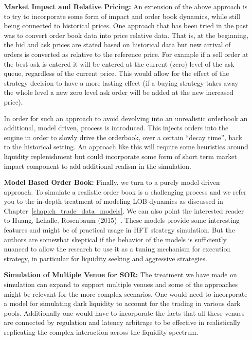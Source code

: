 \noindent\textbf{Market Impact and Relative Pricing:} An extension of the above approach is to try to incorporate some form of impact and order book dynamics, while still being connected to historical prices. One approach that has been tried in the past was to convert order book data into price relative data. That is, at the beginning, the bid and ask prices are stated based on historical data but new arrival of orders is converted as relative to the reference price. For example if a sell order at the best ask is entered it will be entered at the current (zero) level of the ask queue, regardless of the current price. This would allow for the effect of the strategy decision to have a more lasting effect (if a buying strategy takes away the whole level a new zero level ask order will be added at the new increased price). 


In order for such an approach to avoid devolving into an unrealistic orderbook an additional, model driven, process is introduced. This injects orders into the engine in order to slowly drive the orderbook, over a certain ``decay time'', back to the historical setting. An approach like this will require some heuristics around liquidity replenishment but could incorporate some form of short term market impact component to add additional realism in the simulation. \twomedskip


\noindent\textbf{Model Based Order Book:} Finally, we turn to a purely model driven approach. To simulate a realistic order book is a challenging process and we refer you to the in-depth treatment of modeling LOB dynamics as discussed in Chapter~\ref{chap:ch_trade_data_models}. We can also point the interested reader to Huang, Lehalle, Rosenbaum (2015)~\cite{hlehros}. These models provide some interesting features and might be of practical usage in HFT strategy simulation. But the authors are somewhat skeptical if the behavior of the models is sufficiently nuanced to allow the research to use it as a tuning mechanism for execution strategy, in particular for liquidity seeking and aggressive strategies.
\twomedskip


\noindent\textbf{Simulation of Multiple Venue for SOR:} The treatment we have made on simulation can expand to support multiple venues and some of the approaches might be relevant for the more complex scenarios. One would need to incorporate a model for simulating dark liquidity to account for the trading in various dark pools. Additionally one would have to incorporate the facts that all these venues are connected by regulation and latency arbitrage to be effective in realistically replicating the complex interaction across the liquidity spectrum.\twomedskip


